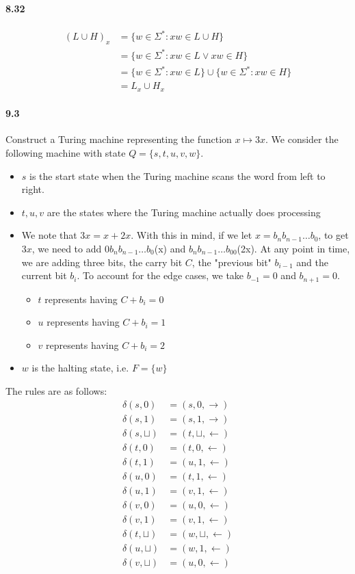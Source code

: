 \documentclass{article}
\begin{document}
\paragraph{8.32}
\begin{align*}
	(L\cup H)_x &= \{w\in \Sigma^* : xw\in L\cup H\}\\
	&= \{w\in \Sigma^* : xw\in L\lor xw\in H\}\\
	&= \{w\in \Sigma^* : xw\in L\}\cup \{w\in \Sigma^* : xw\in H\}\\
	&= L_x\cup H_x
\end{align*}

\paragraph{9.3} Construct a Turing machine representing the function $x\mapsto 3x$. We consider the following machine with state $Q=\{s,t,u,v,w\}$.
\begin{itemize}
	\item $s$ is the start state when the Turing machine scans the word from left to right.
	\item $t,u,v$ are the states where the Turing machine actually does processing
	\item We note that $3x=x+2x$. With this in mind, if we let $x=b_nb_{n-1}\dots b_0$, to get $3x$, we need to add $0b_nb_{n-1}\dots b_0$(x) and $b_nb_{n-1}\dots b_00$(2x). At any point in time, we are adding three bits, the carry bit $C$, the "previous bit" $b_{i-1}$ and the current bit $b_{i}$. To account for the edge cases, we take $b_{-1}=0$ and $b_{n+1}=0$.
	\begin{itemize}
		\item $t$ represents having $C+b_i=0$
		\item $u$ represents having $C+b_i=1$
		\item $v$ represents having $C+b_i=2$
	\end{itemize}
	\item $w$ is the halting state, i.e. $F=\{w\}$
\end{itemize}
The rules are as follows:
\begin{align*}
	\delta(s,0)&=(s,0,\rightarrow)\\
	\delta(s,1)&=(s,1,\rightarrow)\\
	\delta(s,\sqcup)&=(t,\sqcup,\leftarrow)\\
	\delta(t,0)&=(t,0,\leftarrow)\\
	\delta(t,1)&=(u,1,\leftarrow)\\
	\delta(u,0)&=(t,1,\leftarrow)\\
	\delta(u,1)&=(v,1,\leftarrow)\\
	\delta(v,0)&=(u,0,\leftarrow)\\
	\delta(v,1)&=(v,1,\leftarrow)\\
	\delta(t,\sqcup)&=(w,\sqcup,\leftarrow)\\
	\delta(u,\sqcup)&=(w,1,\leftarrow)\\
	\delta(v,\sqcup)&=(u,0,\leftarrow)
\end{align*}
\end{document}
